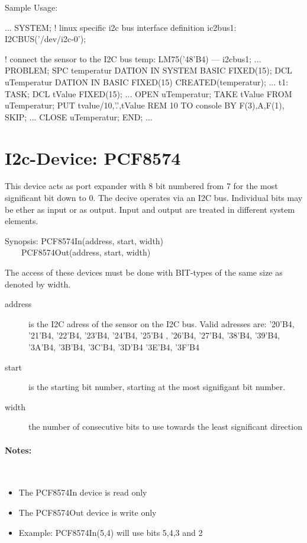 Sample Usage:
\begin{PEARLCode}
...
SYSTEM;
   ! linux specific i2c bus interface definition
   ic2bus1: I2CBUS('/dev/i2c-0');

   ! connect the sensor to the I2C bus
   temp: LM75('48'B4) --- i2cbus1;
...
PROBLEM;
   SPC temperatur DATION IN SYSTEM BASIC FIXED(15);
   DCL uTemperatur DATION IN BASIC FIXED(15) CREATED(temperatur);
...
t1: TASK;
   DCL tValue FIXED(15);
...
   OPEN uTemperatur;
   TAKE tValue FROM uTemperatur;
   PUT tvalue/10,'.',tValue REM 10 TO console BY F(3),A,F(1), SKIP;
...
   CLOSE uTemperatur;
END;
...
\end{PEARLCode}

\section{I2c-Device: PCF8574}
This device acts as port expander with 8 bit numbered from 7
for the most significant bit down to 0.
The decive operates via an I2C bus. 
Individual bits may be ether as input or as output.
Input and output are treated in different system elements.

Synopsis: PCF8574In(address, start, width) \\
\ \ \ \ PCF8574Out(address, start, width)

The access of these devices must be done with BIT-types of the same size
as denoted by width.

\begin{description}
\item[address] is the I2C adress of the sensor on the I2C bus.
   Valid adresses are: '20'B4, '21'B4, '22'B4, '23'B4,
            '24'B4, '25'B4 , '26'B4, '27'B4,
            '38'B4, '39'B4, '3A'B4, '3B'B4, '3C'B4, '3D'B4 '3E'B4, '3F'B4
\item[start] is the starting bit number, starting at the most signifigant bit 
    number. 
\item[width] the number of consecutive bits to use
      towards the least significant direction
\end{description}

\paragraph{Notes:}\ 
\begin{itemize}
\item The PCF8574In device is read only
\item The PCF8574Out device is write only
\item Example: PCF8574In(5,4) will use bits 5,4,3 and 2 
\end{itemize}


